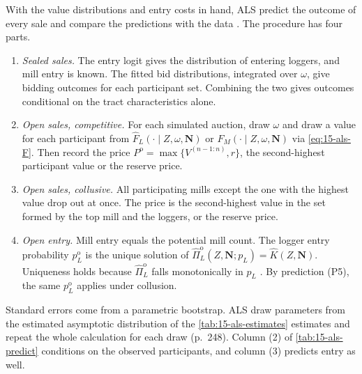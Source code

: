 With the value distributions and entry costs in hand, ALS predict the outcome of every sale and compare
the predictions with the data \citep[pp.~247--248]{AtheyLevinSeira2011}. The procedure has four parts.
\begin{enumerate}[label=(\arabic*)]
\item \emph{Sealed sales.} The entry logit gives the distribution of entering loggers, and mill entry is
known. The fitted bid distributions, integrated over $\omega$, give bidding outcomes for each participant
set. Combining the two gives outcomes conditional on the tract characteristics alone.
\item \emph{Open sales, competitive.} For each simulated auction, draw $\omega$ and draw a value for each
participant from $\hat F_L(\cdot\mid Z,\omega,\bm N)$ or $\hat F_M(\cdot\mid Z,\omega,\bm N)$ via
\eqref{eq:15-als-F}. Then record the price $P^{\mathrm o}=\max\{V^{(n-1:n)},r\}$, the second-highest
participant value or the reserve price.
\item \emph{Open sales, collusive.} All participating mills except the one with the highest value drop out
at once. The price is the second-highest value in the set formed by the top mill and the loggers, or the
reserve price.
\item \emph{Open entry.} Mill entry equals the potential mill count. The logger entry probability
$p^{\mathrm o}_L$ is the unique solution of $\hat\Pi^{\mathrm o}_L(Z,\bm N;p_L)=\hat K(Z,\bm N)$. Uniqueness
holds because $\hat\Pi^{\mathrm o}_L$ falls monotonically in $p_L$ \citep[footnote 27]{AtheyLevinSeira2011}.
By prediction (P5), the same $p^{\mathrm o}_L$ applies under collusion.
\end{enumerate}
Standard errors come from a parametric bootstrap. ALS draw parameters from the estimated asymptotic
distribution of the \cref{tab:15-als-estimates} estimates and repeat the whole calculation for each draw
(p.~248). Column (2) of \cref{tab:15-als-predict} conditions on the observed participants, and column (3)
predicts entry as well.

